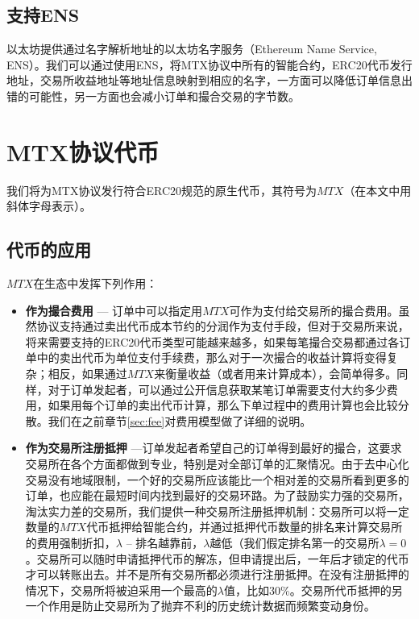 \documentclass[UTF8,nofonts]{ctexart}
\begin{document}
\subsection{支持ENS\label{sec:registration}}

以太坊提供通过名字解析地址的以太坊名字服务（Ethereum Name Service, ENS）\cite{hirai2016formal}。我们可以通过使用ENS，将MTX协议中所有的智能合约，ERC20代币发行地址，交易所收益地址等地址信息映射到相应的名字，一方面可以降低订单信息出错的可能性，另一方面也会减小订单和撮合交易的字节数。



\section{MTX协议代币\label{sec:protocoltoken}}

我们将为MTX协议发行符合ERC20规范的原生代币，其符号为$MTX$（在本文中用斜体字母表示）。


\subsection{代币的应用}

$MTX$在生态中发挥下列作用：

\begin{itemize}
	\item \textbf{作为撮合费用} --- 订单中可以指定用$MTX$可作为支付给交易所的撮合费用。虽然协议支持通过卖出代币成本节约的分润作为支付手段，但对于交易所来说，将来需要支持的ERC20代币类型可能越来越多，如果每笔撮合交易都通过各订单中的卖出代币为单位支付手续费，那么对于一次撮合的收益计算将变得复杂；相反，如果通过$MTX$来衡量收益（或者用来计算成本），会简单得多。同样，对于订单发起者，可以通过公开信息获取某笔订单需要支付大约多少费用，如果用每个订单的卖出代币计算，那么下单过程中的费用计算也会比较分散。我们在之前章节\ref{sec:fee}对费用模型做了详细的说明。
	\item \textbf{作为交易所注册抵押} ---订单发起者希望自己的订单得到最好的撮合，这要求交易所在各个方面都做到专业，特别是对全部订单的汇聚情况。由于去中心化交易没有地域限制，一个好的交易所应该能比一个相对差的交易所看到更多的订单，也应能在最短时间内找到最好的交易环路。为了鼓励实力强的交易所，淘汰实力差的交易所，我们提供一种交易所注册抵押机制：交易所可以将一定数量的$MTX$代币抵押给智能合约，并通过抵押代币数量的排名来计算交易所的费用强制折扣，$\lambda$ -- 排名越靠前，$\lambda$越低（我们假定排名第一的交易所$\lambda=0$。交易所可以随时申请抵押代币的解冻，但申请提出后，一年后才锁定的代币才可以转账出去。并不是所有交易所都必须进行注册抵押。在没有注册抵押的情况下，交易所将被迫采用一个最高的$\lambda$值，比如30\%。交易所代币抵押的另一个作用是防止交易所为了抛弃不利的历史统计数据而频繁变动身份。
\end{itemize}
\end{document}
